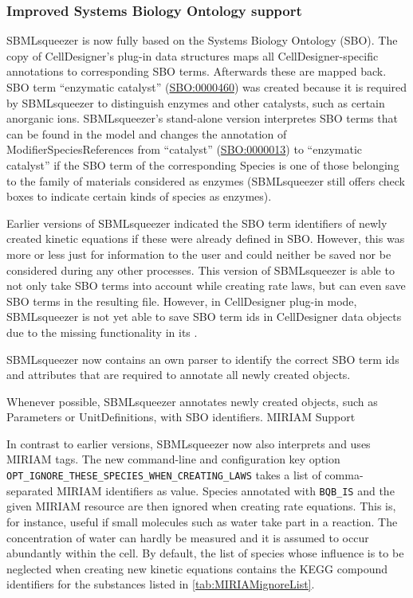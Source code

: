 \subsubsection{Improved Systems Biology Ontology support}

SBMLsqueezer is now fully based on the Systems Biology Ontology (SBO). The \JSBML
copy of CellDesigner's plug-in data structures maps all CellDesigner-specific
annotations to corresponding SBO terms. Afterwards these are mapped back. SBO
term ``enzymatic catalyst''
(\href{identifiers.org/biomodels.sbo/SBO:0000460}{SBO:0000460}) was created
because it is required by SBMLsqueezer to distinguish enzymes and other
catalysts, such as certain anorganic ions. SBMLsqueezer's stand-alone version
interpretes SBO terms that can be found in the model and changes the annotation
of ModifierSpeciesReferences from ``catalyst''
(\href{identifiers.org/biomodels.sbo/SBO:0000013}{SBO:0000013}) to ``enzymatic
catalyst'' if the SBO term of the corresponding Species is one of those
belonging to the family of materials considered as enzymes (SBMLsqueezer still
offers check boxes to indicate certain kinds of species as enzymes).

Earlier versions of SBMLsqueezer indicated the SBO term identifiers of newly
created kinetic equations if these were already defined in SBO. However, this
was more or less just for information to the user and could neither be saved nor
be considered during any other processes. This version of SBMLsqueezer is able
to not only take SBO terms into account while creating rate laws, but can even
save SBO terms in the resulting \SBML file. However, in CellDesigner plug-in
mode, SBMLsqueezer is not yet able to save SBO term ids in CellDesigner data
objects due to the missing functionality in its \API.

SBMLsqueezer now contains an own parser to identify the correct SBO term ids and
attributes that are required to annotate all newly created objects.

Whenever possible, SBMLsqueezer annotates newly created objects, such as
Parameters or UnitDefinitions, with SBO identifiers.
MIRIAM Support

In contrast to earlier versions, SBMLsqueezer now also interprets and uses
MIRIAM tags. The new command-line and configuration key option
\verb!OPT_IGNORE_THESE_SPECIES_WHEN_CREATING_LAWS! takes a list of
comma-separated MIRIAM identifiers as value. Species annotated with
\verb!BQB_IS! and the given MIRIAM resource are then ignored when creating rate
equations. This is, for instance, useful if small molecules such as water take
part in a reaction. The concentration of water can hardly be measured and it is
assumed to occur abundantly within the cell. By default, the list of species
whose influence is to be neglected when creating new kinetic equations contains
the KEGG compound identifiers for the substances listed in
\vref{tab:MIRIAMignoreList}.

